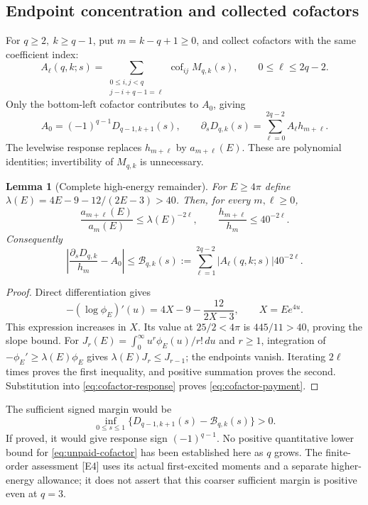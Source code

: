 \documentclass[11pt,letterpaper]{article}
\numberwithin{equation}{section}
\newtheorem{lemma}[theorem]{Lemma}
\theoremstyle{remark}
\DeclareMathOperator{\cof}{cof}
\newcommand{\dd}{\,d}
\newcommand{\evid}[1]{\textsf{[#1]}}
\newcommand{\Bcal}{\mathcal B}
\begin{document}
\subsection{Endpoint concentration and collected cofactors}

For \(q\ge2,\ k\ge q-1\), put \(m=k-q+1\ge0\), and collect cofactors
with the same coefficient index:
\begin{equation}
 A_\ell(q,k;s)=
 \sum_{\substack{0\le i,j<q\\j-i+q-1=\ell}}\cof_{ij}M_{q,k}(s),
 \qquad 0\le\ell\le2q-2.
 \label{eq:cofactor-collection}
\end{equation}
Only the bottom-left cofactor contributes to \(A_0\), giving
\begin{equation}
 A_0=(-1)^{q-1}D_{q-1,k+1}(s),\qquad
 \partial_sD_{q,k}(s)=\sum_{\ell=0}^{2q-2}A_\ell h_{m+\ell}.
 \label{eq:cofactor-response}
\end{equation}
The levelwise response replaces \(h_{m+\ell}\) by
\(a_{m+\ell}(E)\). These are polynomial identities; invertibility
of \(M_{q,k}\) is unnecessary.

\begin{lemma}[Complete high-energy remainder]\label{lem:cofactor}
For \(E\ge4\pi\) define
\(\lambda(E)=4E-9-12/(2E-3)>40\).
Then, for every \(m,\ell\ge0\),
\begin{equation}
 \frac{a_{m+\ell}(E)}{a_m(E)}
 \le\lambda(E)^{-2\ell},\qquad
 \frac{h_{m+\ell}}{h_m}\le40^{-2\ell}.
 \label{eq:slope-ratios}
\end{equation}
Consequently
\begin{equation}
 \left|\frac{\partial_sD_{q,k}}{h_m}-A_0\right|
 \le\Bcal_{q,k}(s):=\sum_{\ell=1}^{2q-2}|A_\ell(q,k;s)|40^{-2\ell}.
 \label{eq:cofactor-payment}
\end{equation}
\end{lemma}
\begin{proof}
Direct differentiation gives
\[
 -(\log\phi_E)'(u)=4X-9-\frac{12}{2X-3},\qquad X=Ee^{4u}.
\]
This expression increases in \(X\). Its value at \(25/2<4\pi\)
is \(445/11>40\), proving the slope bound.
For \(J_r(E)=\int_0^\infty u^r\phi_E(u)/r!\dd u\) and \(r\ge1\),
integration of \(-\phi_E'\ge\lambda(E)\phi_E\) gives
\(\lambda(E)J_r\le J_{r-1}\); the endpoints vanish.
Iterating \(2\ell\) times proves the first inequality, and positive
summation proves the second. Substitution into
\eqref{eq:cofactor-response} proves \eqref{eq:cofactor-payment}.
\end{proof}

The sufficient signed margin would be
\begin{equation}
 \inf_{0\le s\le1}
 \{D_{q-1,k+1}(s)-\Bcal_{q,k}(s)\}>0.
 \label{eq:unpaid-cofactor}
\end{equation}
If proved, it would give response sign \((-1)^{q-1}\).
No positive quantitative lower bound for
\eqref{eq:unpaid-cofactor} has been established here as \(q\) grows.
The finite-order assessment \evid{E4} uses its actual first-excited
moments and a separate higher-energy allowance; it does not assert
that this coarser sufficient margin is positive even at \(q=3\).
\end{document}
